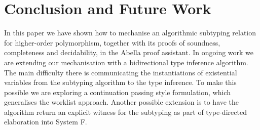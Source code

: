 
\section{Conclusion and Future Work}

In this paper we have shown how to mechanise an algorithmic subtyping relation
for higher-order polymorphism, together with its proofs of soundness,
completeness and decidability, in the Abella proof assistant. 
In ongoing work we are extending our mechanisation with a bidirectional type
inference algorithm. The main difficulty there is communicating the
instantiations of existential variables from the subtyping algorithm to the
type inference. To make this possible we are exploring a continuation passing
style formulation, which generalises the worklist approach.
Another possible extension is to have the algorithm return an explicit witness
for the subtyping as part of type-directed elaboration into System F.
